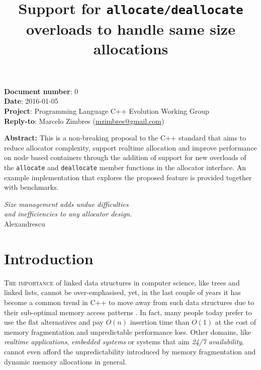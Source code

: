 \documentclass[11pt]{article}
\begin{document}
\date{}
\title{\bf Support for \texttt{allocate/deallocate} overloads to
handle same size allocations}

\vspace{-2cm}
\maketitle


\noindent
{\bf Document number}:  0 \\
{\bf Date}:  2016-01-05 \\
{\bf Project}: Programming Language C++ Evolution Working Group \\
{\bf Reply-to}: Marcelo Zimbres (\href{mailto:mzimbres@gmail.com}{mzimbres@gmail.com}) 

\vspace{1cm}

\noindent
{\bf Abstract: }This is a non-breaking proposal to the C++ standard
that aims to reduce allocator complexity, support realtime allocation
and improve performance on node based containers through the addition
of support for new overloads of the \texttt{allocate} and
\texttt{deallocate} member functions in the allocator interface. An
example implementation that explores the proposed feature is provided
together with benchmarks.

\tableofcontents

\vfill
\begin{flushright}
\noindent
{\it Size management adds undue difficulties \\
     and inefficiencies to any allocator design.} \\
Alexandrescu \\
\medskip
{\it }
\end{flushright}
\medskip

\section{Introduction}
\textsc{The importance} of linked data structures in computer science,
like trees and linked lists, cannot be over-emphasised, yet, in the
last couple of years it has become a common trend in C++ to move away
from such data structures due to their sub-optimal memory access
patterns \cite{chandler, meyers}.  In fact, many people today prefer to use the flat
alternatives and pay $O(n)$ insertion time than $O(1)$ at the cost of
memory fragmentation and unpredictable performance loss. Other
domains, like {\it realtime applications}, {\it embedded systems} or
systems that aim {\it 24/7 availability}, cannot even afford the
unpredictability introduced by memory fragmentation and dynamic
memory allocations in general.
\end{document}
